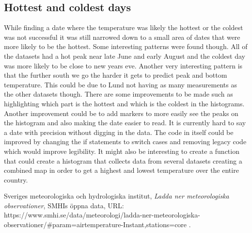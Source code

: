 \documentclass[aps,prl,groupedaddress,twocolumn]{revtex4-1}
\begin{document}
\subsection{Hottest and coldest days}
While finding a date where the temperature was likely the hottest or the coldest was not successful it was still narrowed down to a small area of dates that were more likely to be the hottest. Some interesting patterns were found though. All of the datasets had a hot peak near late June and early August and the coldest day was more likely to be close to new years eve. Another very interesting pattern is that the further south we go the harder it gets to predict peak and bottom temperature. This could be due to Lund not having as many measurements as the other datasets though.
There are some improvements to be made such as highlighting which part is the hottest and which is the coldest in the histograms. Another improvement could be to add markers to more easily see the peaks on the histogram and also making the date easier to read. It is currently hard to say a date with precision without digging in the data. The code in itself could be improved by changing the if statements to switch cases and removing legacy code which would improve legibility. It might also be interesting to create a function that could create a histogram that collects data from several datasets creating a combined map in order to get a highest and lowest temperature over the entire country.

\begin{thebibliography}{99}

Sveriges meteorologiska och hydrologiska institut, \textit{Ladda ner meteorologiska observationer}, SMHIs öppna data, URL: https://www.smhi.se/data/meteorologi/ladda-ner-meteorologiska-observationer/\#param=airtemperature-Instant,stations=core .
\end{thebibliography}
\end{document}
